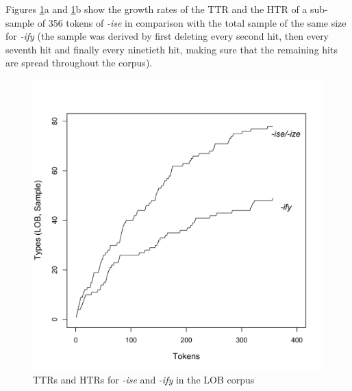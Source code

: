 Figures \ref{fig:izesamplettrhtr}a and \ref{fig:izesamplettrhtr}b show the growth rates of the TTR and the HTR of a sub-sample of 356 tokens of \textit{-ise} in comparison with the total sample of the same size for \textit{-ify} (the sample was derived by first deleting every second hit, then every seventh hit and finally every ninetieth hit, making sure that the remaining hits are spread throughout the corpus).

\begin{figure}
\caption{TTRs and HTRs for \textit{-ise} and \textit{-ify} in the LOB corpus}
\label{fig:izesamplettrhtr}
\begin{minipage}{.5\textwidth}
  \centering
  \includegraphics[width=\textwidth]{figures/lobsampleiseifytypes}
\end{minipage}
%
\begin{minipage}{.5\textwidth}
  \centering

\end{minipage}
\end{figure}
